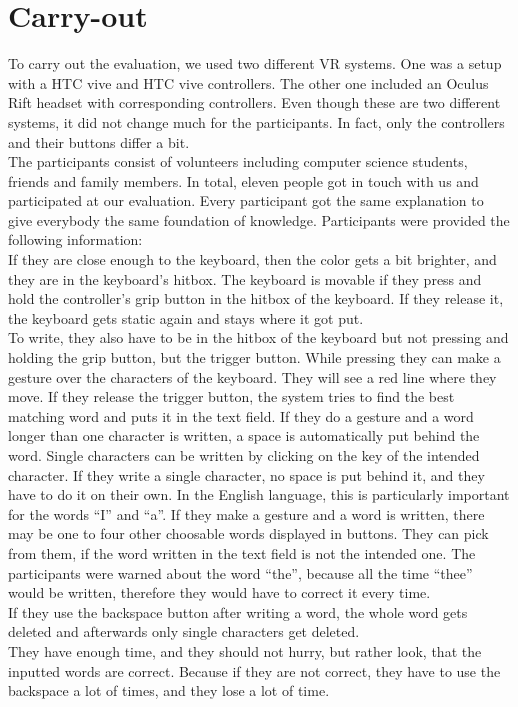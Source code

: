 \section{Carry-out}
To carry out the evaluation, we used two different VR systems. One was a setup with a HTC vive and HTC vive controllers. The other one included an Oculus Rift headset with corresponding controllers. Even though these are two different systems, it did not change much for the participants. In fact, only the controllers and their buttons differ a bit.\\
The participants consist of volunteers including computer science students, friends and family members. In total, eleven people got in touch with us and participated at our evaluation. Every participant got the same explanation to give everybody the same foundation of knowledge.
Participants were provided the following information:\\
If they are close enough to the keyboard, then the color gets a bit brighter, and they are in the keyboard's hitbox. The keyboard is movable if they press and hold the controller's grip button in the hitbox of the keyboard. If they release it, the keyboard gets static again and stays where it got put.\\
To write, they also have to be in the hitbox of the keyboard but not pressing and holding the grip button, but the trigger button. While pressing they can make a gesture over the characters of the keyboard. They will see a red line where they move. If they release the trigger button, the system tries to find the best matching word and puts it in the text field. If they do a gesture and a word longer than one character is written, a space is automatically put behind the word. Single characters can be written by clicking on the key of the intended character. If they write a single character, no space is put behind it, and they have to do it on their own. In the English language, this is particularly important for the words ``I'' and ``a''. If they make a gesture and a word is written, there may be one to four other choosable words displayed in buttons. They can pick from them, if the word written in the text field is not the intended one. The participants were warned about the word ``the'', because all the time ``thee'' would be written, therefore they would have to correct it every time.\\
If they use the backspace button after writing a word, the whole word gets deleted and afterwards only single characters get deleted.\\
They have enough time, and they should not hurry, but rather look, that the inputted words are correct. Because if they are not correct, they have to use the backspace a lot of times, and they lose a lot of time.


